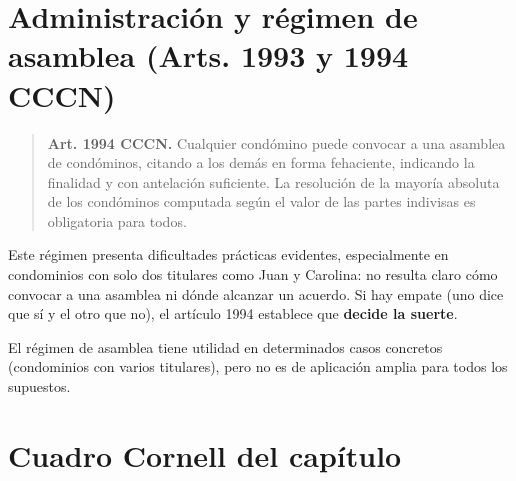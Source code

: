 \documentclass[12pt,oneside]{book}
\begin{document}
\section{Administración y régimen de asamblea (Arts. 1993 y 1994 CCCN)}

\begin{quote}
\textbf{Art. 1994 CCCN.} Cualquier condómino puede convocar a una asamblea de condóminos, citando a los demás en forma fehaciente, indicando la finalidad y con antelación suficiente. La resolución de la mayoría absoluta de los condóminos computada según el valor de las partes indivisas es obligatoria para todos.
\end{quote}


Este régimen presenta dificultades prácticas evidentes, especialmente en condominios con solo dos titulares como Juan y Carolina: no resulta claro cómo convocar a una asamblea ni dónde alcanzar un acuerdo. Si hay empate (uno dice que sí y el otro que no), el artículo 1994 establece que \textbf{decide la suerte}.

El régimen de asamblea tiene utilidad en determinados casos concretos (condominios con varios titulares), pero no es de aplicación amplia para todos los supuestos.

\section{Cuadro Cornell del capítulo}
\end{document}
